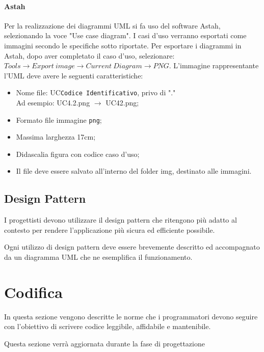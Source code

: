 \paragraph{Astah}
Per la realizzazione dei diagrammi UML si fa uso del software Astah, selezionando la voce "Use case diagram". 
I casi d'uso verranno esportati come immagini secondo le specifiche sotto riportate. Per esportare i diagrammi in Astah, dopo aver completato il caso d'uso, selezionare: $Tools \rightarrow Export\ image \rightarrow Current\ Diagram \rightarrow PNG$.
L'immagine rappresentante l'UML deve avere le seguenti caratteristiche:
\begin{itemize}
\item Nome file: UC\texttt{Codice Identificativo}, privo di "."\\
Ad esempio: UC4.2.png $\rightarrow$ UC42.png;
\item Formato file immagine \texttt{png};
\item Massima larghezza 17cm;
\item Didascalia figura con codice caso d'uso;
\item Il file deve essere salvato all'interno del folder img, destinato alle immagini.
\end{itemize}

\subsection{Design Pattern}

I progettisti devono utilizzare il design pattern che ritengono più adatto al contesto per rendere l’applicazione più sicura ed efficiente possibile.

Ogni utilizzo di design pattern deve essere brevemente descritto ed accompagnato da un diagramma UML che ne esemplifica il funzionamento.

\section{Codifica}
In questa sezione vengono descritte le norme che i programmatori devono seguire con l’obiettivo di scrivere codice leggibile, affidabile e mantenibile.

Questa sezione verrà aggiornata durante la fase di progettazione

